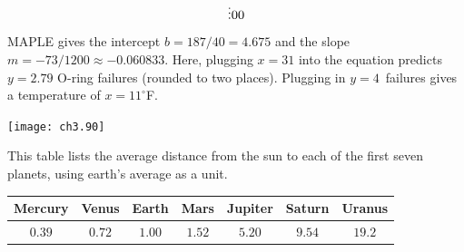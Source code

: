 \begin{exercises}
\begin{answer}
\begin{exparts}
\begin{equation*}
{%
                     \vdots \\
                     0 \\
                     0}
          \end{equation*}
          MAPLE gives the intercept $b=187/40=4.675$ and the 
          slope $m=-73/1200\approx -0.060833$.
          Here, plugging $x=31$ into the equation predicts 
          $y=2.79$ O-ring failures (rounded to two places).
          Plugging in $y=4$~failures gives a temperature of 
          $x=11^\circ$F.
     \begin{center}  \small
       \texttt{[image: ch3.90]}
      \end{center}
      \end{exparts}  
    \end{answer}
  \item 
     This table lists the average distance from the sun to
     each of the first seven planets, using earth's average as a unit.
     \begin{center}
       \begin{tabular}{ccccccc}
         Mercury &Venus   &Earth   &Mars    &Jupiter &Saturn  &Uranus  \\ 
         \hline     
         $0.39$  &$0.72$  &$1.00$  &$1.52$  &$5.20$  &$9.54$  &$19.2$
       \end{tabular}
     \end{center}

\end{exercises}
